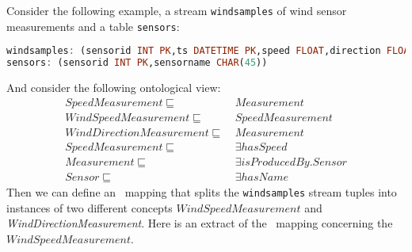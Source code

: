 




Consider the following example, a stream \texttt{windsamples} of wind sensor measurements  and a table \texttt{sensors}:
\begin{lstlisting}[style=HaskellSNEE,language=Haskell,frame=none]
windsamples: (sensorid INT PK,ts DATETIME PK,speed FLOAT,direction FLOAT)
sensors: (sensorid INT PK,sensorname CHAR(45))
\end{lstlisting}
And consider the following ontological view:
\begin{align*}%
SpeedMeasurement \sqsubseteq\ & Measurement \\
WindSpeedMeasurement \sqsubseteq\ & SpeedMeasurement \\
WindDirectionMeasurement \sqsubseteq\ & Measurement \\
SpeedMeasurement \sqsubseteq\ & \exists hasSpeed \\
Measurement \sqsubseteq\ & \exists isProducedBy.Sensor \\
Sensor \sqsubseteq\ & \exists hasName
\end{align*}
%
Then we can define an \stwoo\ mapping that splits the \texttt{windsamples} stream tuples into instances of two different concepts $WindSpeedMeasurement$ and \textit{WindDirectionMeasurement}. Here is an extract of the \stwoo\ mapping concerning the $WindSpeedMeasurement$.

